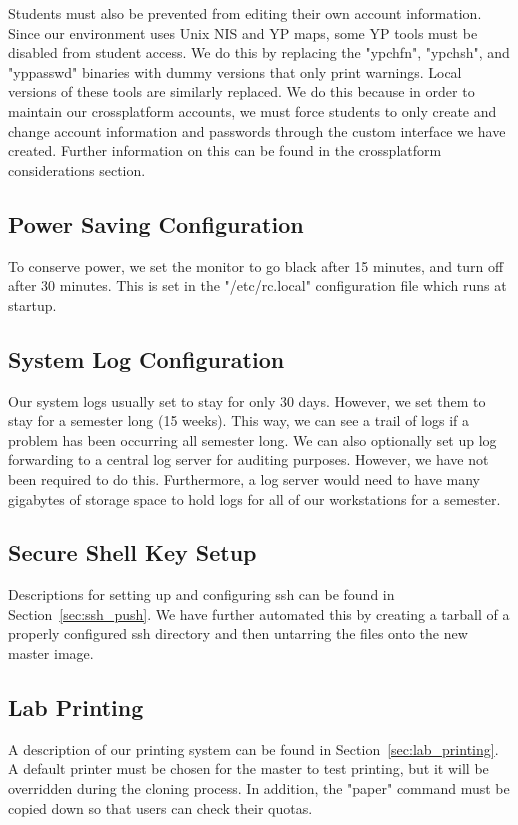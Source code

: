 Students must also be prevented from editing their own account information.  Since our environment uses Unix NIS and YP  maps, some YP tools must be disabled from student access.  We do this by replacing the "ypchfn", "ypchsh", and "yppasswd" binaries with dummy versions that only print warnings.  Local versions of these tools are similarly replaced.  We do this because in order to maintain our crossplatform accounts, we must force students to only create and change account information and passwords through the custom interface we have created.  Further information on this can be found in the crossplatform considerations section.

\subsection{Power Saving Configuration}
To conserve power, we set the monitor to go black after 15 minutes, and turn off after 30 minutes.  This is set in the "/etc/rc.local" configuration file which runs at startup.  

\subsection{System Log Configuration}
Our system logs usually set to stay for only 30 days.  However, we set them to stay for a semester long (15 weeks).  This way, we can see a trail of logs if a problem has been occurring all semester long.  We can also optionally set up log forwarding to a central log server for auditing purposes.  However, we have not been required to do this.  Furthermore, a log server would need to have many gigabytes of storage space to hold logs for all of our workstations for a semester.  

\subsection{Secure Shell Key Setup}
Descriptions for setting up and configuring ssh can be found in Section~\ref{sec:ssh_push}.  We have further automated this by creating a tarball of a properly configured ssh directory and then untarring the files onto the new master image.  

\subsection{Lab Printing}
A description of our printing system can be found in Section~\ref{sec:lab_printing}.  A default printer must be chosen for the master to test printing, but it will be overridden during the cloning process.  In addition, the "paper" command must be copied down so that users can check their quotas.  

